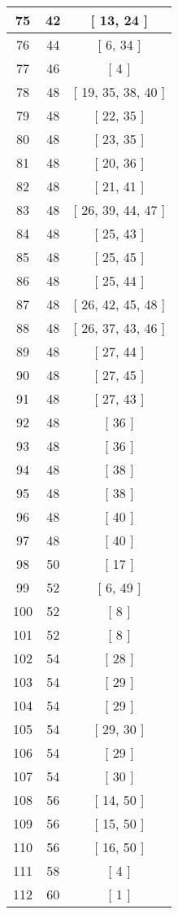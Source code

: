 \begin{center}
\begin{longtable}[H]{|| c c c ||}
75 & 42 & [ 13, 24 ]
\\\hline
76 & 44 & [ 6, 34 ]
\\\hline
77 & 46 & [ 4 ]
\\\hline
78 & 48 & [ 19, 35, 38, 40 ]
\\\hline
79 & 48 & [ 22, 35 ]
\\\hline
80 & 48 & [ 23, 35 ]
\\\hline
81 & 48 & [ 20, 36 ]
\\\hline
82 & 48 & [ 21, 41 ]
\\\hline
83 & 48 & [ 26, 39, 44, 47 ]
\\\hline
84 & 48 & [ 25, 43 ]
\\\hline
85 & 48 & [ 25, 45 ]
\\\hline
86 & 48 & [ 25, 44 ]
\\\hline
87 & 48 & [ 26, 42, 45, 48 ]
\\\hline
88 & 48 & [ 26, 37, 43, 46 ]
\\\hline
89 & 48 & [ 27, 44 ]
\\\hline
90 & 48 & [ 27, 45 ]
\\\hline
91 & 48 & [ 27, 43 ]
\\\hline
92 & 48 & [ 36 ]
\\\hline
93 & 48 & [ 36 ]
\\\hline
94 & 48 & [ 38 ]
\\\hline
95 & 48 & [ 38 ]
\\\hline
96 & 48 & [ 40 ]
\\\hline
97 & 48 & [ 40 ]
\\\hline
98 & 50 & [ 17 ]
\\\hline
99 & 52 & [ 6, 49 ]
\\\hline
100 & 52 & [ 8 ]
\\\hline
101 & 52 & [ 8 ]
\\\hline
102 & 54 & [ 28 ]
\\\hline
103 & 54 & [ 29 ]
\\\hline
104 & 54 & [ 29 ]
\\\hline
105 & 54 & [ 29, 30 ]
\\\hline
106 & 54 & [ 29 ]
\\\hline
107 & 54 & [ 30 ]
\\\hline
108 & 56 & [ 14, 50 ]
\\\hline
109 & 56 & [ 15, 50 ]
\\\hline
110 & 56 & [ 16, 50 ]
\\\hline
111 & 58 & [ 4 ]
\\\hline
112 & 60 & [ 1 ]
\\\hline

\end{longtable}
\end{center}
